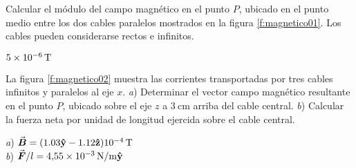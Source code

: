 \setcounter{figure}{0}

\begin{Exercise}\label{p:magnetico01}
    Calcular el módulo del campo magnético en el punto $P$, ubicado en el punto medio entre los dos cables paralelos mostrados en la figura \ref{f:magnetico01}. Los cables pueden considerarse rectos e infinitos.
\end{Exercise}
\begin{Answer}
    $\SI{5E-6}{\tesla}$
\end{Answer}
%
\begin{center}
\end{center}
%
\begin{Exercise}\label{p:magnetico02}
    La figura \ref{f:magnetico02} muestra las corrientes transportadas por tres cables infinitos y paralelos al eje $x$. \textit{a}) Determinar el vector campo magnético resultante en el punto $P$, ubicado sobre el eje $z$ a $\SI{3}{\centi\metre}$ arriba del cable central. \textit{b}) Calcular la fuerza neta por unidad de longitud ejercida sobre el cable central.
\end{Exercise}
\begin{Answer}
    \begin{minipage}[t]{.4\textwidth}
        \textit{a}) $\va*{B} = (1.03\vu{y}-1.12\vu{z})\SI{E-4}{\tesla}$\\ \textit{b}) $\va*{F}/l = \SI{4.55E-3}{\newton/\metre}\vu{y}$
    \end{minipage}
\end{Answer}
%
